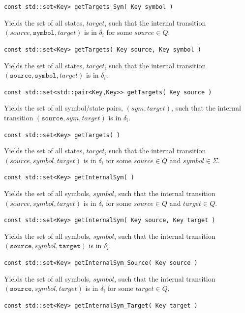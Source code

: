 \documentclass{llncs}
\begin{document}
\begin{description}
  \item\texttt{const std::set<Key> getTargets\_Sym( Key symbol )} \nopagebreak

    Yields the set of all states, $target$, such that the internal transition $(source,\texttt{symbol},target)$ is in $\delta_i$ for some $source \in Q$.

  \item\texttt{const std::set<Key> getTargets( Key source, Key symbol )} \nopagebreak

    Yields the set of all states, $target$, such that the internal transition $(\texttt{source},\texttt{symbol},target)$ is in $\delta_i$.

  \item\texttt{const std::set<std::pair<Key,Key>> getTargets( Key source )} \nopagebreak

    Yields the set of all symbol/state pairs, $(sym,target)$, such that the internal transition $(\texttt{source},sym,target)$ is in $\delta_i$.

  \item\texttt{const std::set<Key> getTargets( )} \nopagebreak

    Yields the set of all states, $target$, such that the internal transition $(source,symbol,target)$ is in $\delta_i$ for some $source \in Q$ and $symbol \in \Sigma$.

  \item\texttt{const std::set<Key> getInternalSym( )} \nopagebreak

    Yields the set of all symbols, $symbol$, such that the internal transition $(source,symbol,target)$ is in $\delta_i$ for some $source \in Q$ and $target \in Q$.

  \item\texttt{const std::set<Key> getInternalSym( Key source, Key target )} \nopagebreak

    Yields the set of all symbols, $symbol$, such that the internal transition $(\texttt{source},symbol,\texttt{target})$ is in $\delta_i$.

  \item\texttt{const std::set<Key> getInternalSym\_Source( Key source )} \nopagebreak

    Yields the set of all symbols, $symbol$, such that the internal transition $(\texttt{source},symbol,target)$ is in $\delta_i$ for some $target \in Q$.

  \item\texttt{const std::set<Key> getInternalSym\_Target( Key target )} \nopagebreak


\end{description}
\end{document}
